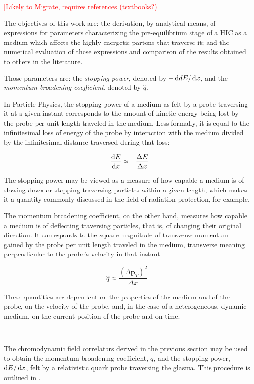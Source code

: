 \textcolor{red}{[Likely to Migrate, requires references (textbooks?)]}

The objectives of this work are: the derivation, by analytical means, of expressions for parameters characterizing the pre-equilibrium stage of a HIC as a medium which affects the highly energetic partons that traverse it; and the numerical evaluation of those expressions and comparison of the results obtained to others in the literature.

Those parameters are: the \textit{stopping power}, denoted by $-\mathop{}\!\mathrm{d} dE / \mathop{}\!\mathrm{d} x$, and the \textit{momentum broadening coefficient}, denoted by $\hat{q}$.

In Particle Physics, the stopping power of a medium as felt by a probe traversing it at a given instant  corresponds to the amount of kinetic energy being lost by the probe per unit length traveled in the medium. Less formally, it is equal to the infinitesimal loss of energy of the probe by interaction with the medium divided by the infinitesimal distance traversed during that loss:

\begin{equation*}
	- \frac{\mathop{}\!\mathrm{d} E}{\mathop{}\!\mathrm{d} x} \approx - \frac{\Delta E}{\Delta x}
\end{equation*}

The stopping power may be viewed as a measure of how capable a medium is of slowing down or stopping traversing particles within a given length, which makes it a quantity commonly discussed in the field of radiation protection, for example.

The momentum broadening coefficient, on the other hand, measures how capable a medium is of deflecting traversing particles, that is, of changing their original direction. It corresponds to the square magnitude of transverse momentum gained by the probe per unit length traveled in the medium, transverse meaning perpendicular to the probe’s velocity in that instant.

\begin{equation*}
	\hat{q} \approx \frac{(\Delta{\mathbf{p}_T})^2}{\Delta x}
\end{equation*}

These quantities are dependent on the properties of the medium and of the probe, on the velocity of the probe, and, in the case of a heterogeneous, dynamic medium, on the current position of the probe and on time.

\textcolor{red}{---------------------------------}

The chromodynamic field correlators derived in the previous section may be used to obtain the momentum broadening coefficient, $\hat{q}$, and the stopping power, $\mathop{}\!\mathrm{d} E/\mathop{}\!\mathrm{d} x$,  felt by a relativistic quark probe traversing the glasma. This procedure is outlined in \cite{Carrington:2022bnv}.


